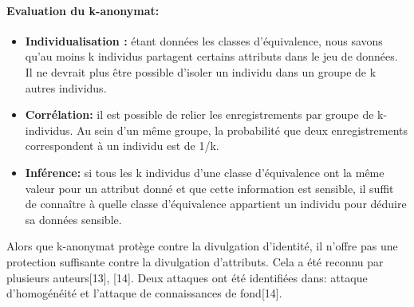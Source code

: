 \paragraph{Evaluation du k-anonymat:}  
\begin{itemize}
    \item \textbf{Individualisation :} étant données les classes d’équivalence, nous savons qu’au moins k individus partagent certains attributs dans le jeu de données. Il ne devrait plus être possible d’isoler un individu dans un groupe de k autres individus. 

    \item \textbf{Corrélation:} il est possible de relier les enregistrements par groupe de k-individus. Au sein d’un même groupe, la probabilité que deux enregistrements correspondent à un individu est de 1/k. 

    \item \textbf{Inférence:} si tous les k individus d’une classe d’équivalence ont la même valeur pour un attribut donné et que cette information est sensible, il suffit de connaître à quelle classe d’équivalence appartient un individu pour déduire sa données sensible. 
\end{itemize}
 
Alors que k-anonymat protège contre la divulgation d'identité, il n'offre pas une protection suffisante contre la divulgation d'attributs. Cela a été reconnu par plusieurs auteurs[13], [14]. Deux attaques ont été identifiées dans: attaque d'homogénéité et l'attaque de connaissances de fond[14]. 